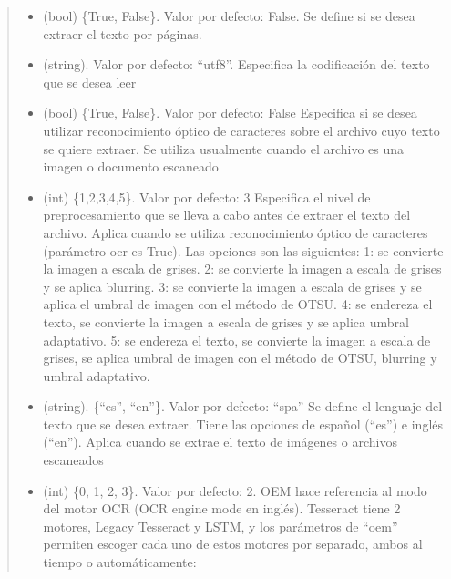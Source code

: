 \documentclass[letterpaper,10pt,openany,spanish]{sphinxmanual}
\begin{document}
\begin{fulllineitems}
\begin{fulllineitems}
\begin{quote}
\begin{description}
\begin{itemize}
\item {} 
 \textendash{} (bool) \{True, False\}. Valor por defecto: False. Se define si se             desea extraer el texto por páginas.

\item {} 
 \textendash{} (string). Valor por defecto: “utf\sphinxhyphen{}8”. Especifica la codificación             del texto que se desea leer

\item {} 
 \textendash{} (bool) \{True, False\}. Valor por defecto: False Especifica si se desea utilizar reconocimiento             óptico de caracteres sobre el archivo cuyo texto se quiere extraer. Se utiliza             usualmente cuando el archivo es una imagen o documento escaneado

\item {} 
 \textendash{} (int) \{1,2,3,4,5\}. Valor por defecto: 3 Especifica el nivel de preprocesamiento             que se lleva a cabo antes de extraer el texto del archivo. Aplica cuando se utiliza             reconocimiento óptico de caracteres (parámetro ocr es True). Las opciones son las siguientes:               
 1: se convierte la imagen a escala de grises.  
 2: se convierte la imagen a escala de grises y se aplica blurring.  
 3: se convierte la imagen a escala de grises y se aplica el umbral de imagen con el método de OTSU.  
 4: se endereza el texto, se convierte la imagen a escala de grises y se aplica umbral adaptativo.  
 5: se endereza el texto, se convierte la imagen a escala de grises, se aplica umbral de imagen con el método de OTSU, blurring y umbral adaptativo.  


\item {} 
 \textendash{} (string). \{“es”, “en”\}. Valor por defecto: “spa”  Se define el lenguaje del texto que se desea extraer.             Tiene las opciones de español (“es”) e inglés (“en”). Aplica cuando se extrae el texto de             imágenes o archivos escaneados

\item {} 
 \textendash{} (int) \{0, 1, 2, 3\}. Valor por defecto: 2. OEM hace referencia al modo del motor OCR (OCR engine mode             en inglés). Tesseract tiene 2 motores, Legacy Tesseract y LSTM, y los parámetros de “oem”             permiten escoger cada uno de estos motores por separado, ambos al tiempo o             automáticamente:
 

\end{itemize}
\end{description}
\end{quote}
\end{fulllineitems}
\end{fulllineitems}
\end{document}
